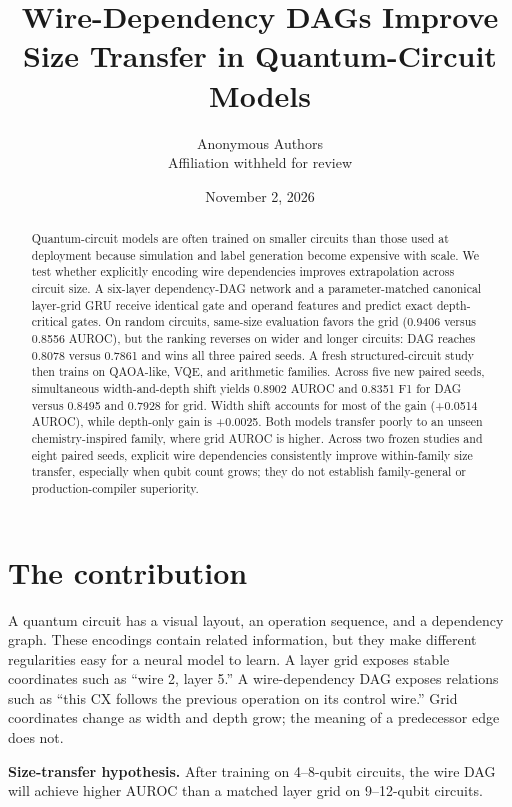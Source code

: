 \documentclass[10pt,twocolumn]{article}
\title{Wire-Dependency DAGs Improve Size Transfer in Quantum-Circuit Models}
\author{Anonymous Authors \\ Affiliation withheld for review}
\date{November 2, 2026}
\begin{document}
\maketitle

\begin{abstract}
Quantum-circuit models are often trained on smaller circuits than those used at deployment because simulation and label generation become expensive with scale. We test whether explicitly encoding wire dependencies improves extrapolation across circuit size. A six-layer dependency-DAG network and a parameter-matched canonical layer-grid GRU receive identical gate and operand features and predict exact depth-critical gates. On random circuits, same-size evaluation favors the grid (0.9406 versus 0.8556 AUROC), but the ranking reverses on wider and longer circuits: DAG reaches 0.8078 versus 0.7861 and wins all three paired seeds. A fresh structured-circuit study then trains on QAOA-like, VQE, and arithmetic families. Across five new paired seeds, simultaneous width-and-depth shift yields 0.8902 AUROC and 0.8351 F1 for DAG versus 0.8495 and 0.7928 for grid. Width shift accounts for most of the gain (+0.0514 AUROC), while depth-only gain is +0.0025. Both models transfer poorly to an unseen chemistry-inspired family, where grid AUROC is higher. Across two frozen studies and eight paired seeds, explicit wire dependencies consistently improve within-family size transfer, especially when qubit count grows; they do not establish family-general or production-compiler superiority.
\end{abstract}

\section{The contribution}

A quantum circuit has a visual layout, an operation sequence, and a dependency graph. These encodings contain related information, but they make different regularities easy for a neural model to learn. A layer grid exposes stable coordinates such as ``wire 2, layer 5.'' A wire-dependency DAG exposes relations such as ``this CX follows the previous operation on its control wire.'' Grid coordinates change as width and depth grow; the meaning of a predecessor edge does not.

\noindent\textbf{Size-transfer hypothesis.} After training on 4--8-qubit circuits, the wire DAG will achieve higher AUROC than a matched layer grid on 9--12-qubit circuits.
\end{document}
